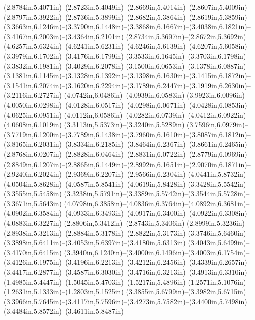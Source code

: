 (2.8784in,5.4071in)--(2.8723in,5.4049in)--(2.8669in,5.4014in)--(2.8607in,5.4009in) (2.8797in,5.3922in)--(2.8736in,5.3899in)--(2.8682in,5.3864in)--(2.8619in,5.3859in) (3.3663in,6.1246in)--(3.3790in,6.1448in)--(3.3868in,6.1667in)--(3.4038in,6.1821in)--(3.4167in,6.2003in)--(3.4364in,6.2101in) (2.8734in,5.3697in)--(2.8672in,5.3692in) (4.6257in,5.6324in)--(4.6241in,5.6231in)--(4.6246in,5.6139in)--(4.6207in,5.6058in) (3.3979in,6.1702in)--(3.4176in,6.1799in) (3.3533in,6.1645in)--(3.3703in,6.1798in)--(3.3832in,6.1981in)--(3.4029in,6.2078in) (3.1500in,6.0653in)--(3.1378in,6.0887in)--(3.1381in,6.1145in)--(3.1328in,6.1392in)--(3.1398in,6.1630in)--(3.1415in,6.1872in)--(3.1541in,6.2074in)--(3.1620in,6.2294in)--(3.1789in,6.2447in)--(3.1919in,6.2630in)--(3.2116in,6.2727in) (4.0742in,6.0486in)--(4.0939in,6.0583in) (3.9923in,6.0096in)--(4.0050in,6.0298in)--(4.0128in,6.0517in)--(4.0298in,6.0671in)--(4.0428in,6.0853in)--(4.0625in,6.0951in) (4.0112in,6.0586in)--(4.0282in,6.0739in)--(4.0412in,6.0922in)--(4.0608in,6.1019in) (3.3113in,5.5373in)--(3.3240in,5.5289in) (3.7596in,6.0979in)--(3.7719in,6.1200in)--(3.7789in,6.1438in)--(3.7960in,6.1610in)--(3.8087in,6.1812in)--(3.8165in,6.2031in)--(3.8334in,6.2185in)--(3.8464in,6.2367in)--(3.8661in,6.2465in) (2.8768in,6.0207in)--(2.8828in,6.0464in)--(2.8831in,6.0722in)--(2.8779in,6.0969in)--(2.8849in,6.1207in)--(2.8865in,6.1449in)--(2.8992in,6.1651in)--(2.9070in,6.1871in)--(2.9240in,6.2024in)--(2.9369in,6.2207in)--(2.9566in,6.2304in) (4.0441in,5.8732in)--(4.0504in,5.8628in)--(4.0587in,5.8541in)--(4.0619in,5.8428in) (3.3428in,5.5542in)--(3.3555in,5.5458in) (3.3238in,5.5791in)--(3.3389in,5.5742in)--(3.3544in,5.5728in)--(3.3671in,5.5643in) (4.0798in,6.3858in)--(4.0836in,6.3764in)--(4.0892in,6.3681in)--(4.0902in,6.3584in)--(4.0933in,6.3493in)--(4.0917in,6.3400in)--(4.0922in,6.3308in)--(4.0883in,6.3227in) (2.8806in,5.3412in)--(2.8743in,5.3406in) (2.8999in,5.3236in)--(2.8938in,5.3213in)--(2.8884in,5.3178in)--(2.8822in,5.3173in) (3.3746in,5.6460in)--(3.3898in,5.6411in)--(3.4053in,5.6397in)--(3.4180in,5.6313in) (3.4043in,5.6499in)--(3.4170in,5.6415in) (3.3940in,6.1240in)--(3.4000in,6.1496in)--(3.4003in,6.1754in)--(3.4126in,6.1975in)--(3.4196in,6.2213in)--(3.4212in,6.2456in)--(3.4339in,6.2657in)--(3.4417in,6.2877in)--(3.4587in,6.3030in)--(3.4716in,6.3213in)--(3.4913in,6.3310in) (1.4985in,5.4447in)--(1.5045in,5.4703in)--(1.5217in,5.4896in) (1.2571in,5.1076in)--(1.2631in,5.1333in)--(1.2803in,5.1525in) (3.3855in,5.6799in)--(3.3982in,5.6715in) (3.3966in,5.7645in)--(3.4117in,5.7596in)--(3.4273in,5.7582in)--(3.4400in,5.7498in) (3.4484in,5.8572in)--(3.4611in,5.8487in) 